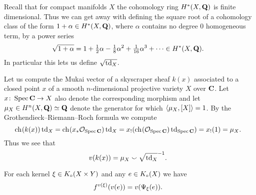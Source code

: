\begin{remark}
    \label{sqrt of cohomology class}
    Recall that for compact manifolds $X$ the cohomology ring $H^{*}(X, \mathbf Q)$ is finite dimensional. Thus we can get away with defining the square root of a cohomology class of the form $1 + \alpha \in H^{*}(X, \mathbf Q)$, where $\alpha$ contains no degree $0$ homogeneous term, by a power series
    \begin{equation}
        \label{eq: sqrt power series}
        \sqrt{1 + \alpha} = 1 + \tfrac{1}{2}\alpha - \tfrac{1}{8}\alpha^2 + \tfrac{1}{16}\alpha^3 + \cdots \in H^{*}(X, \mathbf Q).
    \end{equation}
    In particular this lets us define $\sqrt{\operatorname{td}_{X}}$.
\end{remark}

\begin{example}
    \label{Mukai vector of skyscraper}
    Let us compute the Mukai vector of a skyscraper sheaf $k(x)$ associated to a closed point $x$ of a smooth $n$-dimensional projective variety $X$ over $\mathbf C$. Let $x \colon \operatorname{Spec}\mathbf C \to X$ also denote the corresponding morphism and let
    $\mu_X \in H^{n}(X, \mathbf Q) \simeq \mathbf Q$ denote the generator for which $\langle \mu_X, [X] \rangle = 1$. By the Grothendieck--Riemann--Roch formula we compute
    \[
        \ch[](k(x))\tdclass{X} = \ch[]{x_*\struct{\spec{\C}}} \tdclass{X} = x_!(\ch[]{\struct{\spec{\C}}}\tdclass{\spec{\C}}) = x_!(1) = \mu_X.
    \]
    Thus we see that
    \[
        v(k(x)) = \mu_X \smallsmile \sqrt{\operatorname{td}_{X}}^{-1}.
    \]
\end{example}

\begin{proposition}
    \label{Mukai vector FM transform interaction}
    \emph{\cite[\S 5.2, Corollary 5.29]{huybrechts2006fouriermukai}}
    For each kernel $\xi \in K_{\circ}(X \times Y)$ and any $e \in K_{\circ}(X)$ we have
    \[
        f^{v(\xi)}(v(e)) = v(\Psi_{\xi}(e)).
    \]  
\end{proposition}

